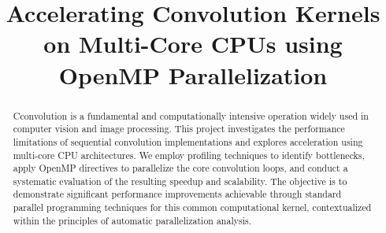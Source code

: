 \documentclass[conference, 10pt]{IEEEtran}
\begin{document}
\title{Accelerating Convolution Kernels on Multi-Core CPUs using OpenMP Parallelization}
\author{
\and
\and
\and
}


\maketitle 

\begin{abstract}
Cconvolution is a fundamental and computationally intensive operation widely used in computer vision and image processing. This project investigates the performance limitations of sequential convolution implementations and explores acceleration using multi-core CPU architectures. We employ profiling techniques to identify bottlenecks, apply OpenMP directives to parallelize the core convolution loops, and conduct a systematic evaluation of the resulting speedup and scalability. The objective is to demonstrate significant performance improvements achievable through standard parallel programming techniques for this common computational kernel, contextualized within the principles of automatic parallelization analysis.
\end{abstract}
\end{document}
